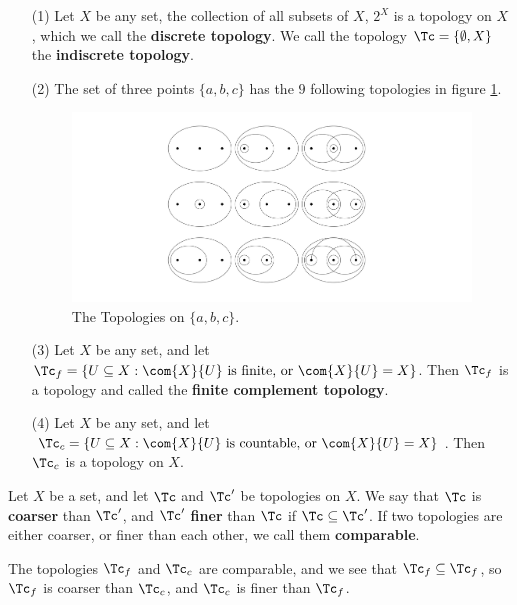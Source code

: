 \begin{example}
    \begin{enumerate}
        \item[(1)] Let $X$ be any set, the collection of all subsets of  $X$,  $2^X$ is a topology
            on $X$, which we call the \textbf{discrete topology}. We call the topology
            $\Tc=
            \{\emptyset, X\}$ the \textbf{indiscrete topology}.

        \item[(2)] The set of three points $\{a, b, c\}$ has the  $9$ following
            topologies
            in figure \ref{fig1.1}.
            \begin{figure}[h]
                \centering
                \includegraphics[scale = 0.3]{Figures/Chapter1/topologiesOn3Points.png}
                \caption{The Topologies on $\{a, b, c\}$.}
                \label{fig1.1}
            \end{figure}

        \item[(3)] Let $X$ be any set, and let  $\Tc_f=\{U \subseteq X: \com{X}{U}
                \text{ is finite, or } \com{X}{U}=X\}$. Then  $\Tc_f$ is a
                topology and called the \textbf{finite complement topology}.

        \item[(4)] Let $X$ be any set, and let  $\Tc_c=\{U \subseteq X: \com{X}{U}
                \text{ is countable, or } \com{X}{U}=X\}$. Then  $\Tc_c$ is a
                topology on $X$.
    \end{enumerate}
\end{example}

\begin{definition}
    Let $X$ be a set, and let $\Tc$ and  $\Tc'$ be topologies on  $X$. We say that
    $\Tc$ is  \textbf{coarser} than $\Tc'$, and $\Tc'$ \textbf{finer} than $\Tc$ if
    $\Tc \subseteq \Tc'$.
    If two topologies are either coarser, or finer than each other, we call them
    \textbf{comparable}.
\end{definition}

\begin{example}
    The topologies $\Tc_f$ and  $\Tc_c$ are comparable, and we see that  $\Tc_f
    \subseteq \Tc_f$, so $\Tc_f$ is coarser than  $\Tc_c$, and  $\Tc_c$ is finer than
    $\Tc_f$.
\end{example}
